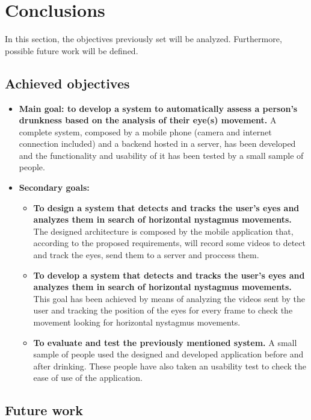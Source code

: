 \section{Conclusions}
\label{conclusions}

In this section, the objectives previously set will be analyzed. Furthermore, possible future work will be defined.

\subsection{Achieved objectives}

\begin{itemize}
  \item \textbf{Main goal: to develop a system to automatically assess a person’s drunkness based on the analysis of their eye(s) movement.} A complete system, composed by a mobile phone (camera and internet connection included) and a backend hosted in a server, has been developed and the functionality and usability of it has been tested by a small sample of people.
  \item \textbf{Secondary goals:}
  \begin{itemize}
    \item \textbf{To design a system that detects and tracks the user’s eyes and analyzes them in search of horizontal nystagmus movements.} The designed architecture is composed by the mobile application that, according to the proposed requirements, will record some videos to detect and track the eyes, send them to a server and proccess them.
    \item \textbf{To develop a system that detects and tracks the user’s eyes and analyzes them in search of horizontal nystagmus movements.} This goal has been achieved by means of analyzing the videos sent by the user and tracking the position of the eyes for every frame to check the movement looking for horizontal nystagmus movements.
    \item \textbf{To evaluate and test the previously mentioned system.} A small sample of people used the designed and developed application before and after drinking. These people have also taken an usability test to check the ease of use of the application.
  \end{itemize}
\end{itemize}

\subsection{Future work}

